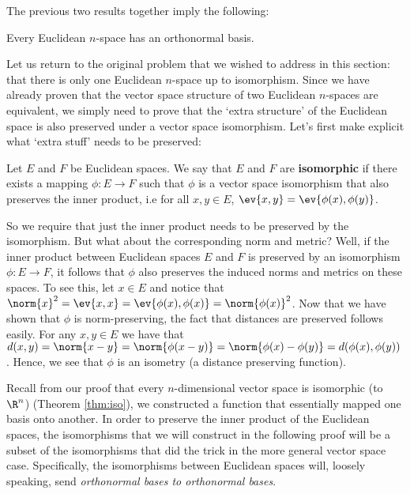 The previous two results together imply the following:
\begin{theorem}
  Every Euclidean \( n \)-space has an orthonormal basis.
\end{theorem}

Let us return to the original problem that we wished to address in this section: that there is only one Euclidean \( n \)-space up to isomorphism. Since we have already proven that the vector space structure of two Euclidean \( n \)-spaces are equivalent, we simply need to prove that the `extra structure' of the Euclidean space is also preserved under a vector space isomorphism. Let's first make explicit what `extra stuff' needs to be preserved:

\begin{definition}
  Let \( E \) and \( F \) be Euclidean spaces. We say that \( E \) and \( F \) are \textbf{isomorphic} if there exists a mapping \( \phi:E\to F \) such that \( \phi \) is a vector space isomorphism that also preserves the inner product, i.e for all \( x,y\in E \), \( \ev{x,y}=\ev{\phi(x),\phi(y)} \).
\end{definition}

So we require that just the inner product needs to be preserved by the isomorphism. But what about the corresponding norm and metric? Well, if the inner product between Euclidean spaces \( E \) and \( F \) is preserved by an isomorphism \( \phi:E\to F \), it follows that \( \phi \) also preserves the induced norms and metrics on these spaces. To see this, let \( x\in E \) and notice that \( \norm{x}^2=\ev{x,x}=\ev{\phi(x),\phi(x)}=\norm{\phi(x)}^2 \). Now that we have shown that \( \phi \) is norm-preserving, the fact that distances are preserved follows easily. For any \( x,y\in E \) we have that \( d(x,y)=\norm{x-y}=\norm{\phi(x-y)}=\norm{\phi(x)-\phi(y)}=d(\phi(x),\phi(y)) \). Hence, we see that \( \phi \) is an isometry (a distance preserving function).

\vspace{3mm}

Recall from our proof that every \( n \)-dimensional vector space is isomorphic (to \( \R^n \)) (Theorem \ref{thm:iso}), we constructed a function that essentially mapped one basis onto another. In order to preserve the inner product of the Euclidean spaces, the isomorphisms that we will construct in the following proof will be a subset of the isomorphisms that did the trick in the more general vector space case. Specifically, the isomorphisms between Euclidean spaces will, loosely speaking, send \emph{orthonormal bases to orthonormal bases}.

